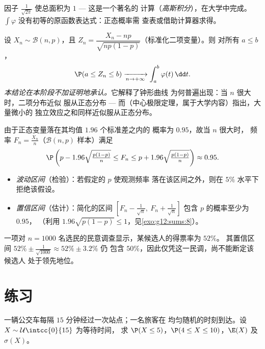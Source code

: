 \begin{remark}
因子 $\frac{1}{\sqrt{2\pi}}$ 使总面积为 $1$ --- 这是一个著名的
计算（\emph{高斯积分}），在大学中完成。
$\int \varphi$ 没有初等的原函数表达式：正态概率需
查表或借助计算器求得。
\end{remark}

\begin{theorem}\label{thm:g12:contdist:tcl}
设 $X_n \sim \mathcal B(n, p)$，且
$Z_n = \dfrac{X_n - np}{\sqrt{np(1-p)}}$（标准化二项变量）。则
对所有 $a \leq b$，
\[
\P(a \leq Z_n \leq b) \xrightarrow[n\to+\infty]{}
\int_a^b \varphi(t)\,\dd t .
\]
\emph{本结论在本阶段不加证明地承认。}它解释了钟形曲线
为何普遍出现：当 $n$ 很大时，二项分布近似
服从正态分布 --- 而（中心极限定理，属于大学内容）指出，大量微小的
独立效应之和同样近似服从正态分布。
\end{theorem}

\begin{method}[$95\%$ 水平下的波动区间]\label{met:g12:contdist:fluctuation}
由于正态变量落在其均值 $1.96$ 个标准差之内的
概率为 $0.95$，故当 $n$ 很大时，
频率 $F_n = \frac{X_n}{n}$（$\mathcal B(n,p)$ 样本）满足
\[
\P\left(p - 1.96\sqrt{\tfrac{p(1-p)}{n}} \leq F_n \leq
p + 1.96\sqrt{\tfrac{p(1-p)}{n}}\right) \approx 0.95 .
\]
\begin{itemize}
  \item \emph{波动区间}（检验）：若假定的 $p$ 使观测频率
        落在该区间之外，则在
        $5\%$ 水平下拒绝该假设。
  \item \emph{置信区间}（估计）：简化的区间
        $\left[F_n - \frac{1}{\sqrt n},\ F_n + \frac{1}{\sqrt n}\right]$
        包含 $p$ 的概率至少为 $0.95$，
        （利用 $1.96\sqrt{p(1-p)} \leq 1$，见\cref{exo:g12:sums:8}）。
\end{itemize}
\end{method}

\begin{example}\label{ex:g12:contdist:poll}
一项对 $n = 1000$ 名选民的民意调查显示，某候选人的得票率为 $52\%$。
其置信区间 $52\% \pm \frac{1}{\sqrt{1000}} \approx 52\% \pm 3.2\%$ 仍
包含 $50\%$，因此仅凭这一民调，尚不能断定该候选人
处于领先地位。
\end{example}

\section{练习}

\begin{exercise}[$\star$]\label{exo:g12:contdist:1}
一辆公交车每隔 $15$ 分钟经过一次站点；一名旅客在
均匀随机的时刻到达。设 $X \sim \mathcal U\intcc{0}{15}$ 为等待时间，
求 $\P(X \leq 5)$，$\P(4 \leq X \leq 10)$，$\E(X)$ 及 $\sigma(X)$。
\end{exercise}

